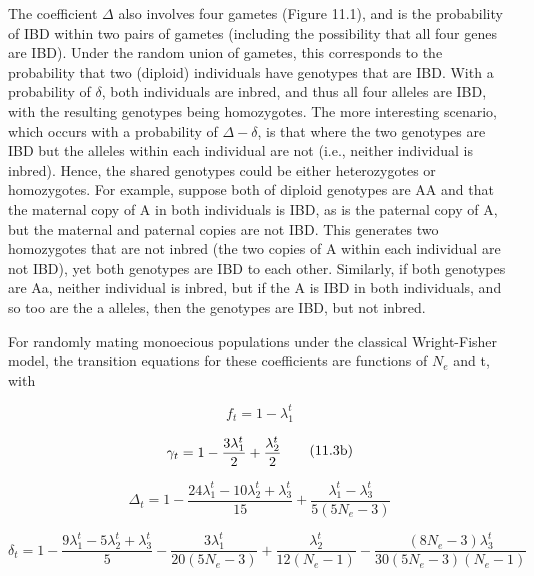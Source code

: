\documentclass{article}
\begin{document}
The coefficient  $ \Delta $ also involves four gametes (Figure 11.1), and is the probability of IBD within two pairs of gametes (including the possibility that all four genes are IBD). Under the random union of gametes, this corresponds to the probability that two (diploid) individuals have genotypes that are IBD. With a probability of  $ \delta $, both individuals are inbred, and thus all four alleles are IBD, with the resulting genotypes being homozygotes. The more interesting scenario, which occurs with a probability of  $ \Delta - \delta $, is that where the two genotypes are IBD but the alleles within each individual are not (i.e., neither individual is inbred). Hence, the shared genotypes could be either heterozygotes or homozygotes. For example, suppose both of diploid genotypes are AA and that the maternal copy of A in both individuals is IBD, as is the paternal copy of A, but the maternal and paternal copies are not IBD. This generates two homozygotes that are not inbred (the two copies of A within each individual are not IBD), yet both genotypes are IBD to each other. Similarly, if both genotypes are Aa, neither individual is inbred, but if the A is IBD in both individuals, and so too are the a alleles, then the genotypes are IBD, but not inbred.

For randomly mating monoecious populations under the classical Wright-Fisher model, the transition equations for these coefficients are functions of  $ N_{e} $ and t, with

\begin{equation}
f_{t}=1-\lambda_{1}^{t}
\tag{11.3a}
\label{eq:11_3a}
\end{equation}

\begin{equation}
\begin{align*}\gamma_t=1-{3\lambda_1^t\over2}+{\lambda_2^t\over2}\end{align*}
\tag{11.3b}
\label{eq:11_3b}
\end{equation}

\begin{equation}
\Delta_{t}=1-\frac{24\lambda_{1}^{t}-10\lambda_{2}^{t}+\lambda_{3}^{t}}{15}+\frac{\lambda_{1}^{t}-\lambda_{3}^{t}}{5(5N_{e}-3)}
\tag{11.3c}
\label{eq:11_3c}
\end{equation}

\begin{equation}
\delta_{t}=1-\frac{9\lambda_{1}^{t}-5\lambda_{2}^{t}+\lambda_{3}^{t}}{5}-\frac{3\lambda_{1}^{t}}{20(5N_{e}-3)}+\frac{\lambda_{2}^{t}}{12(N_{e}-1)}-\frac{(8N_{e}-3)\lambda_{3}^{t}}{30(5N_{e}-3)(N_{e}-1)}
\tag{11.3d}
\label{eq:11_3d}
\end{equation}
\end{document}
